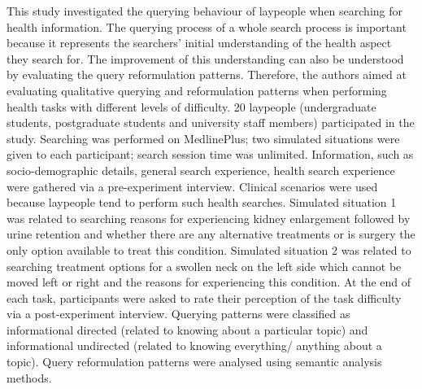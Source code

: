 \documentclass[]{article}
\begin{document}
This study investigated the querying behaviour of laypeople when searching for health information. The querying process of a whole search process is important because it represents the searchers' initial understanding of the health aspect they search for. The improvement of this understanding can also be understood by evaluating the query reformulation patterns. Therefore, the authors aimed at evaluating qualitative querying and reformulation patterns when performing health tasks with different levels of difficulty. 20 laypeople (undergraduate students, postgraduate students and university staff members) participated in the study. Searching was performed on MedlinePlus; two simulated situations were given to each participant; search session time was unlimited. Information, such as socio-demographic details, general search experience, health search experience were gathered via a pre-experiment interview. Clinical scenarios were used because laypeople tend to perform such health searches. Simulated situation 1 was related to searching reasons for experiencing kidney enlargement followed by urine retention and whether there are any alternative treatments or is surgery the only option available to treat this condition. Simulated situation 2 was related to searching treatment options for a swollen neck on the left side which cannot be moved left or right and the reasons for experiencing this condition. At the end of each task, participants were asked to rate their perception of the task difficulty via a post-experiment interview. Querying patterns were classified as informational directed (related to knowing about a particular topic) and informational undirected (related to knowing everything/ anything about a topic). Query reformulation patterns were analysed using semantic analysis methods.
\end{document}
